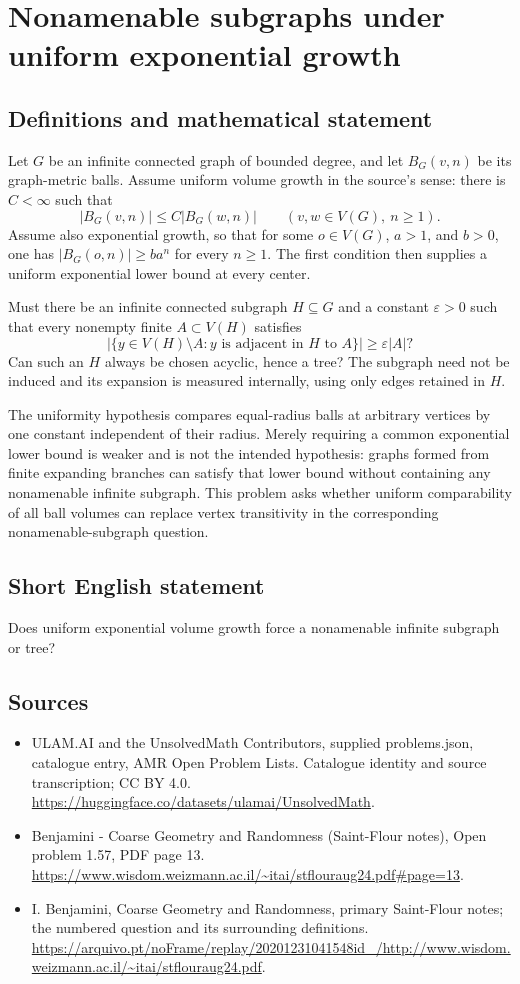 \documentclass[11pt,a4paper]{article}
\begin{document}
\section*{Nonamenable subgraphs under uniform exponential growth}\label{statement}

\subsection{Definitions and mathematical statement}
Let $G$ be an infinite connected graph of bounded degree, and let $B_G(v,n)$ be its graph-metric balls. Assume uniform volume growth in the source's sense: there is $C<\infty$ such that
\[
|B_G(v,n)|\le C|B_G(w,n)|\qquad(v,w\in V(G),\ n\ge1).
\]
Assume also exponential growth, so that for some $o\in V(G)$, $a>1$, and $b>0$, one has $|B_G(o,n)|\ge ba^n$ for every $n\ge1$. The first condition then supplies a uniform exponential lower bound at every center.

Must there be an infinite connected subgraph $H\subseteq G$ and a constant $\varepsilon>0$ such that every nonempty finite $A\subset V(H)$ satisfies
\[
|\{y\in V(H)\setminus A:y\text{ is adjacent in }H\text{ to }A\}|
\ge\varepsilon |A|?
\]
Can such an $H$ always be chosen acyclic, hence a tree? The subgraph need not be induced and its expansion is measured internally, using only edges retained in $H$.

The uniformity hypothesis compares equal-radius balls at arbitrary vertices by one constant independent of their radius. Merely requiring a common exponential lower bound is weaker and is not the intended hypothesis: graphs formed from finite expanding branches can satisfy that lower bound without containing any nonamenable infinite subgraph. This problem asks whether uniform comparability of all ball volumes can replace vertex transitivity in the corresponding nonamenable-subgraph question.
\subsection{Short English statement}
Does uniform exponential volume growth force a nonamenable infinite subgraph or tree?
\subsection{Sources}
\begin{itemize}
\item[S1] ULAM.AI and the UnsolvedMath Contributors, supplied problems.json, catalogue entry, AMR Open Problem Lists. Catalogue identity and source transcription; CC BY 4.0.
\url{https://huggingface.co/datasets/ulamai/UnsolvedMath}.
\item[S2] Benjamini - Coarse Geometry and Randomness (Saint-Flour notes), Open problem 1.57, PDF page 13. 
\url{https://www.wisdom.weizmann.ac.il/~itai/stflouraug24.pdf#page=13}.
\item[S3] I. Benjamini, Coarse Geometry and Randomness, primary Saint-Flour notes; the numbered question and its surrounding definitions.
\url{https://arquivo.pt/noFrame/replay/20201231041548id_/http://www.wisdom.weizmann.ac.il/~itai/stflouraug24.pdf}.
\end{itemize}
\end{document}
